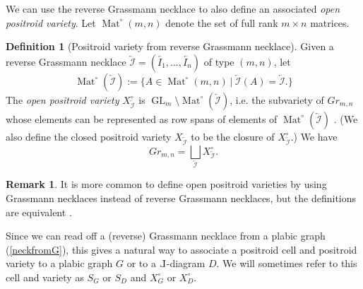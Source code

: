 \documentclass{amsart}
\def\Le{\hbox{\rotatebox[origin=c]{180}{$\Gamma$}}}
\theoremstyle{definition}
\newtheorem{definition}[thm]{Definition}
\newtheorem{remark}[thm]{Remark}
\numberwithin{equation}{section}
\newcommand{\Mat}{\operatorname{Mat}}
\newcommand{\Gl}{\operatorname{GL}}
\begin{document}
We can use the reverse Grassmann necklace to also define
an associated \emph{open positroid variety}.
Let $\Mat^{\circ}(m,n)$ denote the set of full rank $m \times n$ matrices.
\begin{definition}[Positroid variety from reverse Grassmann necklace]\label{def:posvariety}
	Given a reverse Grassmann necklace $\overleftarrow{\mathcal{I}}=(\overleftarrow{I_1},\dots,\overleftarrow{I_n})$
of type $(m,n)$,
let  
	$$\Mat^{\circ}(\overleftarrow{\mathcal{I}}):=\{A \in \Mat^{\circ}(m,n) \ \vert \ 
	\overleftarrow{\mathcal{I}}(A) = \overleftarrow{\mathcal{I}}.\}$$
The \emph{open positroid variety}  
	$X^{\circ}_{\overleftarrow{\mathcal{I}}}$
is 
	$\Gl_m \setminus \Mat^{\circ}(\overleftarrow{\mathcal{I}})$, i.e. the subvariety
of $Gr_{m,n}$ whose elements can be represented
	as row spans of elements of $\Mat^{\circ}(\overleftarrow{\mathcal{I}})$ \cite{KLS}.
	(We also define the closed positroid variety 
	$X_{\overleftarrow{\mathcal{I}}}$ to be the closure of 
	$X^{\circ}_{\overleftarrow{\mathcal{I}}}$.)
	We have $$Gr_{m,n} = \bigsqcup_{\overleftarrow{\mathcal{I}}} X^{\circ}_{\overleftarrow{\mathcal{I}}}.$$
\end{definition}
\begin{remark}
It is more common to define open positroid varieties  by using 
Grassmann necklaces instead of reverse Grassmann necklaces, but the definitions 
	are equivalent
	\cite[Proposition 2.8]{MullerSpeyer}.
\end{remark}


Since we can read off a (reverse) Grassmann necklace from 
a plabic graph (\cref{neckfromG}), this gives a natural way to 
associate a positroid cell and positroid variety to a plabic graph $G$
or to a $\Le$-diagram $D$.
We will sometimes refer to this cell and variety as 
$S_G$ or $S_D$ and 
$X_G^{\circ}$ or 
$X_D^{\circ}$.
\end{document}
